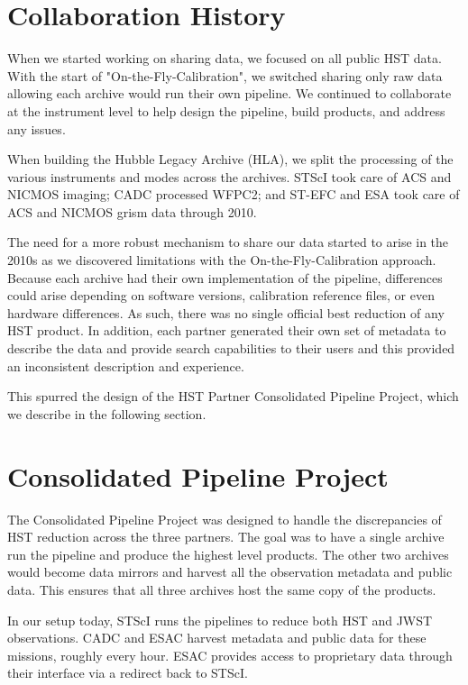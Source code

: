 \documentclass[11pt,twoside]{article}
\begin{document}
\section{Collaboration History}

When we started working on sharing data, we focused on all public HST data. 
With the start of "On-the-Fly-Calibration", we switched sharing only raw data allowing each archive would run their own pipeline. 
We continued to collaborate at the instrument level to help design the pipeline, build products, and address any issues.

When building the Hubble Legacy Archive (HLA), we split the processing of the various instruments and modes across the archives. 
STScI took care of ACS and NICMOS imaging; CADC processed WFPC2; and ST-EFC and ESA took care of ACS and NICMOS grism data through 2010. 

The need for a more robust mechanism to share our data started to arise in the 2010s as we discovered limitations with the On-the-Fly-Calibration approach. 
Because each archive had their own implementation of the pipeline, differences could arise depending on software versions, calibration reference files, or even hardware differences. 
As such, there was no single official best reduction of any HST product. 
In addition, each partner generated their own set of metadata to describe the data and provide search capabilities to their users and this provided an inconsistent description and experience.

This spurred the design of the HST Partner Consolidated Pipeline Project, which we describe in the following section.

\section{Consolidated Pipeline Project}

The Consolidated Pipeline Project was designed to handle the discrepancies of HST reduction across the three partners. 
The goal was to have a single archive run the pipeline and produce the highest level products. 
The other two archives would become data mirrors and harvest all the observation metadata and public data. 
This ensures that all three archives host the same copy of the products. 

In our setup today, STScI runs the pipelines to reduce both HST and JWST observations. 
CADC and ESAC harvest metadata and public data for these missions, roughly every hour. 
ESAC provides access to proprietary data through their interface via a redirect back to STScI.
\end{document}
